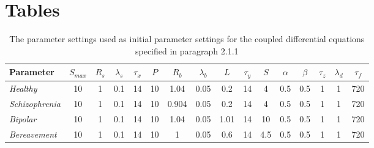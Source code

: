 \documentclass[utf8]{FrontiersinVancouver}
\begin{document}
\newpage
\section*{Tables}
\begin{table}[H]
    \begin{tabular}{|l| c c c c c c c c c c c c c c c|}
    \hline
    \bf{Parameter} & $S_{max}$ & $R_{s}$ & $\lambda_{s}$ & $\tau_{x}$ & $P$ & $R_{b}$ & $\lambda_{b}$ & $L$ & $\tau_{y}$ & $S$ & $\alpha$ & $\beta$ & $\tau_{z}$ & $\lambda_{d}$ & $\tau_{f}$ \\
    \hline
    \it{Healthy} & 10 & 1 & 0.1 & 14 & 10 & 1.04 & 0.05 & 0.2 & 14 & 4 & 0.5 & 0.5 & 1 & 1 & 720 \\
    \hline
    \it{Schizophrenia} & 10 & 1 & 0.1 & 14 & 10 & 0.904 & 0.05 & 0.2 & 14 & 4 & 0.5 & 0.5 & 1 & 1 & 720 \\
    \hline
    \it{Bipolar} & 10 & 1 & 0.1 & 14 & 10 & 1.04 & 0.05 & 1.01 & 14 & 10 & 0.5 & 0.5 & 1 & 1 & 720 \\
    \hline
    \it{Bereavement} & 10 & 1 & 0.1 & 14 & 10 & 1 & 0.05 & 0.6 & 14 & 4.5 & 0.5 & 0.5 & 1 & 1 & 720 \\
    \hline
    \end{tabular}
    \caption{The parameter settings used as initial parameter settings for the coupled differential equations specified in paragraph 2.1.1}\label{tab:1}
    \end{table}



    



\end{document}
